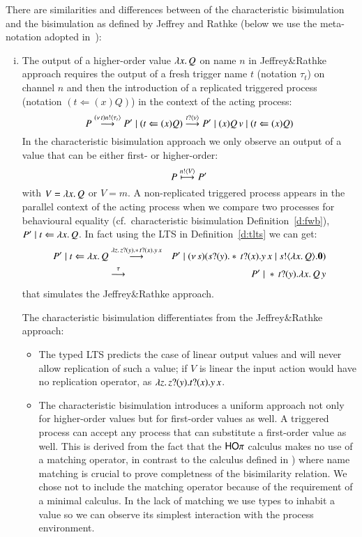 There are similarities and differences between of the characteristic bisimulation
and the bisimulation as defined by Jeffrey and Rathke
(below we use the meta-notation adopted in~\cite{JeffreyR05}):
%
\begin{enumerate}[i)]
	\item	The output of a higher-order value $\lambda x.\,Q$ on name
		$n$ in Jeffrey\&Rathke approach requires the output of
		a fresh trigger name $t$ (notation $\tau_t$)
		on channel $n$ 
		and then the introduction of a replicated triggered process
		(notation $(t \Leftarrow (x) Q)$)
		in the context of the acting process:
		\[
			P \stackrel{(\nu\, t) n ! \langle \tau_{t} \rangle}{\longrightarrow} P' \;|\; (t \Leftarrow (x) Q) \stackrel{t ? \langle v \rangle}{\longrightarrow} P' \;|\; (x) Q\, {v} \;|\; (t \Leftarrow (x) Q) 
		\]
		In the characteristic bisimulation approach we only observe
		an output of a value that can be either first- or higher-order:
		\[
			P \stackrel{n ! \langle V \rangle}{\longmapsto} P' 
		\]
		with $V = \lambda x.\,Q$ or $V = m$.
		A non-replicated triggered process appears in
		the parallel context of the acting process when
		we compare two processes for behavioural equality
		(cf.~characteristic bisimulation Definition~\ref{d:fwb}),
		$P' \;|\; t \Leftarrow \lambda x.\,Q$.
		In fact using the LTS in
		Definition~\ref{d:tlts} we can get:
		\begin{eqnarray*}
			P' \;|\; t \Leftarrow \lambda x.\,Q
			&\stackrel{\lambda z.\,z ? (y) . \ast\,{} t ? (x) . y\, {x}}{\longrightarrow}&
			P' \;|\; (\nu\, s)(s ? (y) . \ast\,{} t ? (x) . y\, {x} \;|\; s ! \langle \lambda x.\,Q \rangle . \mathbf{0})\\
			&\stackrel{\tau}{\longrightarrow}&
			P' \;|\; \ast\,{}t ? (y) . \lambda x.\,Q\, {y}
		\end{eqnarray*}
		that simulates the Jeffrey\&Rathke approach.

		The characteristic bisimulation differentiates from
		the Jeffrey\&Rathke approach:
		\begin{itemize}
			\item	The typed LTS predicts the case of linear
				output values and will never allow replication
				of such a value;
				if $V$ is linear the input action would have no replication
				operator, as
				$\lambda z.\,z ? (y) . t ? (x) . y\, {x}$.

			\item	The characteristic bisimulation introduces a uniform approach
				not only for
				higher-order values but for first-order values
				as well. A triggered process can accept any
				process that can substitute a first-order value as well.
				This is derived from the fact that the $\mathsf{HO}\pi$
				calculus makes no use of a matching operator, in contrast
				to the calculus defined in \cite{DBLP:journals/lmcs/JeffreyR05})
				where name matching is crucial to prove completness
				of the bisimilarity relation.
				We chose not to include the matching operator
				because of the requirement of a minimal calculus.
				In the lack of matching we use types to inhabit
				a value so we can observe its simplest interaction
				with the process environment.


\end{itemize}
\end{enumerate}
